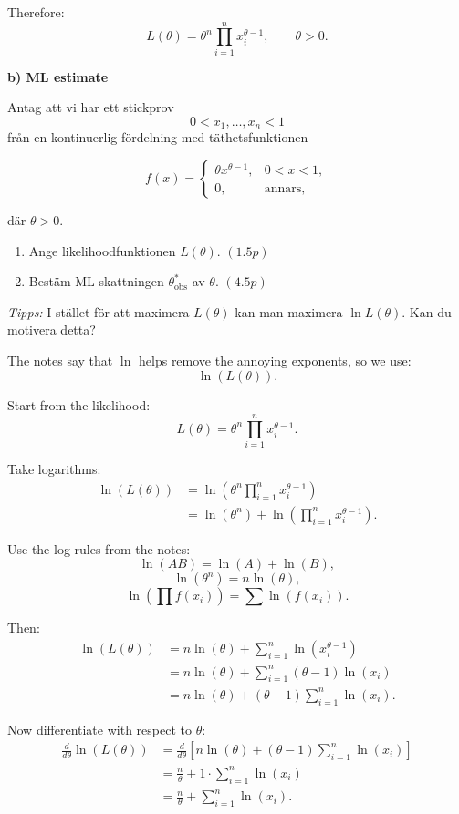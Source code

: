 \documentclass[10pt]{article}
\begin{document}
Therefore:
\[
L(\theta)
=
\theta^n
\prod_{i=1}^{n}
x_i^{\theta-1},
\qquad
\theta>0.
\]

\textbf{b) ML estimate}

Antag att vi har ett stickprov
\[
0<x_1,\ldots,x_n<1
\]
från en kontinuerlig fördelning med täthetsfunktionen

\[
f(x)=
\begin{cases}
\theta x^{\theta-1},
& 0<x<1,\\
0,
& \text{annars},
\end{cases}
\]

där \(\theta>0\).

\begin{enumerate}[label=\alph*)]
\item Ange likelihoodfunktionen \(L(\theta)\).
\hfill \((1.5p)\)

\item Bestäm ML-skattningen
\(\theta^*_{\text{obs}}\) av \(\theta\).
\hfill \((4.5p)\)
\end{enumerate}

\textit{Tipps:} I stället för att maximera
\(L(\theta)\) kan man maximera \(\ln L(\theta)\).
Kan du motivera detta?

The notes say that \(\ln\) helps remove the annoying
exponents, so we use:
\[
\ln(L(\theta)).
\]

Start from the likelihood:
\[
L(\theta)
=
\theta^n
\prod_{i=1}^{n}
x_i^{\theta-1}.
\]

Take logarithms:
\begin{align*}
\ln(L(\theta))
&=
\ln\left(
\theta^n
\prod_{i=1}^{n}
x_i^{\theta-1}
\right)
\\[2mm]
&=
\ln(\theta^n)
+
\ln\left(
\prod_{i=1}^{n}
x_i^{\theta-1}
\right).
\end{align*}

Use the log rules from the notes:
\[
\ln(AB)=\ln(A)+\ln(B),
\]
\[
\ln(\theta^n)=n\ln(\theta),
\]
\[
\ln\left(\prod f(x_i)\right)
=
\sum \ln(f(x_i)).
\]

Then:
\begin{align*}
\ln(L(\theta))
&=
n\ln(\theta)
+
\sum_{i=1}^{n}
\ln\left(
x_i^{\theta-1}
\right)
\\[2mm]
&=
n\ln(\theta)
+
\sum_{i=1}^{n}
(\theta-1)\ln(x_i)
\\[2mm]
&=
n\ln(\theta)
+
(\theta-1)
\sum_{i=1}^{n}
\ln(x_i).
\end{align*}

Now differentiate with respect to \(\theta\):
\begin{align*}
\frac{d}{d\theta}
\ln(L(\theta))
&=
\frac{d}{d\theta}
\left[
n\ln(\theta)
+
(\theta-1)
\sum_{i=1}^{n}
\ln(x_i)
\right]
\\[2mm]
&=
\frac{n}{\theta}
+
1\cdot
\sum_{i=1}^{n}
\ln(x_i)
\\[2mm]
&=
\frac{n}{\theta}
+
\sum_{i=1}^{n}
\ln(x_i).
\end{align*}
\end{document}
